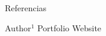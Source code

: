\documentclass[final]{beamer}
\newlength{\sepwidth}
\newlength{\colwidth}
\newcommand{\separatorcolumn}{\begin{column}{\sepwidth}\end{column}}
\begin{document}
\begin{frame}[t]
\begin{columns}[t]
\begin{column}{\colwidth}
\begin{block}{Referencias}
    \nocite{*}
    \footnotesize{}

  \end{block}

  \begin{block}{Author$^{1}$ Portfolio Website}
    
    

  \end{block}

\end{column}
\separatorcolumn



\end{columns}
\end{frame}
\end{document}
